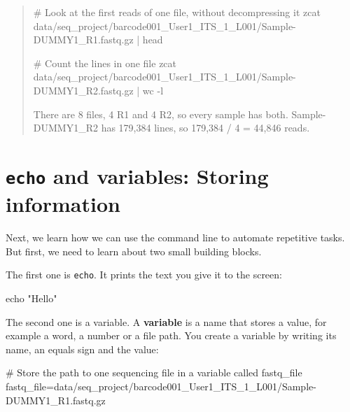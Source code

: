 \documentclass[
  letterpaper,
  DIV=11,
  numbers=noendperiod]{scrreprt}
\newenvironment{Shaded}{}{}
\newcommand{\AttributeTok}[1]{\textcolor[rgb]{0.84,0.23,0.29}{#1}}
\newcommand{\BuiltInTok}[1]{\textcolor[rgb]{0.84,0.23,0.29}{#1}}
\newcommand{\CommentTok}[1]{\textcolor[rgb]{0.42,0.45,0.49}{#1}}
\newcommand{\FunctionTok}[1]{\textcolor[rgb]{0.44,0.26,0.76}{#1}}
\newcommand{\InformationTok}[1]{\textcolor[rgb]{0.42,0.45,0.49}{#1}}
\newcommand{\KeywordTok}[1]{\textcolor[rgb]{0.84,0.23,0.29}{#1}}
\newcommand{\NormalTok}[1]{\textcolor[rgb]{0.14,0.16,0.18}{#1}}
\newcommand{\OperatorTok}[1]{\textcolor[rgb]{0.14,0.16,0.18}{#1}}
\newcommand{\StringTok}[1]{\textcolor[rgb]{0.01,0.18,0.38}{#1}}
\newcommand{\VariableTok}[1]{\textcolor[rgb]{0.89,0.38,0.04}{#1}}
\begin{document}
\begin{tcolorbox}
\begin{quote}
\begin{Shaded}
\begin{Highlighting}[]
\CommentTok{\# Look at the first reads of one file, without decompressing it}
\FunctionTok{zcat}\NormalTok{ data/seq\_project/barcode001\_User1\_ITS\_1\_L001/Sample{-}DUMMY1\_R1.fastq.gz }\KeywordTok{|} \FunctionTok{head}

\CommentTok{\# Count the lines in one file}
\FunctionTok{zcat}\NormalTok{ data/seq\_project/barcode001\_User1\_ITS\_1\_L001/Sample{-}DUMMY1\_R2.fastq.gz }\KeywordTok{|} \FunctionTok{wc} \AttributeTok{{-}l}
\InformationTok{\textasciigrave{}\textasciigrave{}\textasciigrave{}}

\NormalTok{There are 8 files, 4 R1 and 4 R2, so every sample has both.}
\NormalTok{Sample{-}DUMMY1\_R2 has 179,384 lines, so 179,384 / 4 = 44,846 reads.}
\end{Highlighting}
\end{Shaded}
\end{quote}

\end{tcolorbox}

\section{\texorpdfstring{\texttt{echo} and variables: Storing
information}{echo and variables: Storing information}}\label{echo-and-variables-storing-information}

Next, we learn how we can use the command line to automate repetitive
tasks. But first, we need to learn about two small building blocks.

The first one is \texttt{echo}. It prints the text you give it to the
screen:

\begin{Shaded}
\begin{Highlighting}[]
\BuiltInTok{echo} \StringTok{"Hello"}
\end{Highlighting}
\end{Shaded}

The second one is a variable. A \textbf{variable} is a name that stores
a value, for example a word, a number or a file path. You create a
variable by writing its name, an equals sign and the value:

\begin{Shaded}
\begin{Highlighting}[]
\CommentTok{\# Store the path to one sequencing file in a variable called fastq\_file}
\VariableTok{fastq\_file}\OperatorTok{=}\NormalTok{data/seq\_project/barcode001\_User1\_ITS\_1\_L001/Sample{-}DUMMY1\_R1.fastq.gz}
\end{Highlighting}
\end{Shaded}
\end{document}
